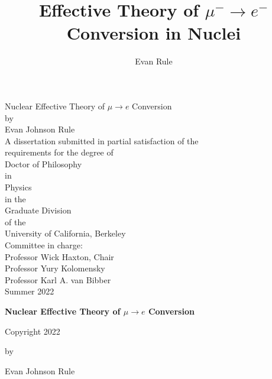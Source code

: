 \documentclass{book}[letterpaper,12pt]
\title{Effective Theory of $\mu^-\rightarrow e^-$ Conversion in Nuclei}
\author{Evan Rule}
\begin{document}
\begin{titlepage}
\begin{center}
\vspace*{1cm}
Nuclear Effective Theory of $\mu\rightarrow e$ Conversion\\
\vspace*{1cm}
by\\
\vspace*{0.5cm}
Evan Johnson Rule\\
\vspace*{1cm}
A dissertation submitted in partial satisfaction of the\\
\vspace*{0.25cm}
requirements for the degree of\\
\vspace*{0.25cm}
Doctor of Philosophy\\
\vspace*{0.25cm}
in\\
\vspace*{0.25cm}
Physics\\
\vspace*{0.25cm}
in the \\
\vspace*{0.25cm}
Graduate Division\\
\vspace*{0.25cm}
of the\\
\vspace*{0.25cm}
University of California, Berkeley\\
\vspace*{2cm}
Committee in charge:\\
\vspace*{1cm}
Professor Wick Haxton, Chair\\
\vspace*{0.25cm}
Professor Yury Kolomensky\\
\vspace*{0.25cm}
Professor Karl A. van Bibber\\
\vspace*{2cm}
Summer 2022
\end{center}
\end{titlepage}
\begin{center}
\textbf{Nuclear Effective Theory of $\mu\rightarrow e$ Conversion}

\vspace{4cm}
Copyright 2022

by

Evan Johnson Rule
\end{center}
\end{document}
